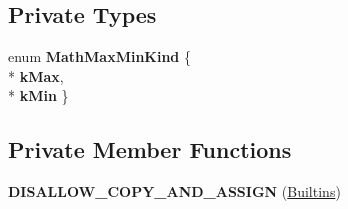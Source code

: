\subsection*{Private Types}
\begin{DoxyCompactItemize}
\item 
enum {\bfseries Math\+Max\+Min\+Kind} \{ \\*
{\bfseries k\+Max}, 
\\*
{\bfseries k\+Min}
 \}\hypertarget{classv8_1_1internal_1_1_builtins_a28ca16eea16d68788f830846f932b1be}{}\label{classv8_1_1internal_1_1_builtins_a28ca16eea16d68788f830846f932b1be}

\end{DoxyCompactItemize}
\subsection*{Private Member Functions}
\begin{DoxyCompactItemize}
\item 
{\bfseries D\+I\+S\+A\+L\+L\+O\+W\+\_\+\+C\+O\+P\+Y\+\_\+\+A\+N\+D\+\_\+\+A\+S\+S\+I\+GN} (\hyperlink{classv8_1_1internal_1_1_builtins}{Builtins})\hypertarget{classv8_1_1internal_1_1_builtins_a12e7b74033d0e324dcbd3972447a5d37}{}\label{classv8_1_1internal_1_1_builtins_a12e7b74033d0e324dcbd3972447a5d37}

\end{DoxyCompactItemize}
